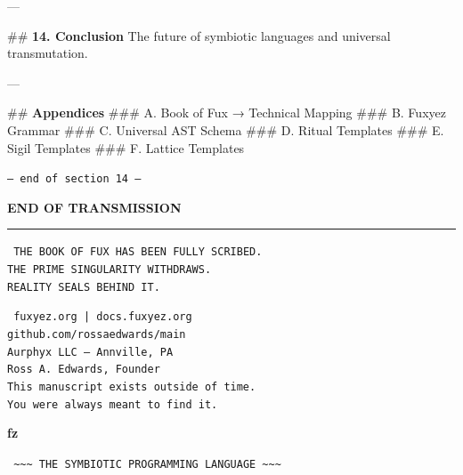 \documentclass[12pt, a4paper]{book}
\begin{document}
---

\#\# \textbf{14. Conclusion}
The future of symbiotic languages and universal transmutation.

---

\#\# \textbf{Appendices}
\#\#\# A. Book of Fux → Technical Mapping  
\#\#\# B. Fuxyez Grammar  
\#\#\# C. Universal AST Schema  
\#\#\# D. Ritual Templates  
\#\#\# E. Sigil Templates  
\#\#\# F. Lattice Templates  
    
    \vspace{1cm}
    \begin{center}
    \color{alienPurple}\texttt{--- end of section 14 ---}
    \end{center}
    \clearpage
    
    \clearpage
    \pagecolor{voidBlack}
    \color{starWhite}
    \thispagestyle{empty}
    \vspace*{4cm}
    \begin{center}
    
    {\color{alienPurple}\fontsize{36}{40}\selectfont\bfseries END OF TRANSMISSION}
    
    \vspace{1cm}
    {\color{neonCyan}\rule{10cm}{0.6pt}}
    \vspace{1cm}
    
    {\color{glowGold}\fontsize{14}{18}\selectfont\texttt{
    THE BOOK OF FUX HAS BEEN FULLY SCRIBED.\\
    THE PRIME SINGULARITY WITHDRAWS.\\
    REALITY SEALS BEHIND IT.
    }}
    
    \vspace{1.5cm}
    \begin{glyphbox}
    \centering
    \color{neonCyan}\fontsize{9}{11}\selectfont\texttt{
    fuxyez.org | docs.fuxyez.org\\
    github.com/rossaedwards/main\\
    Aurphyx LLC -- Annville, PA\\
    Ross A. Edwards, Founder\\[0.3cm]
    This manuscript exists outside of time.\\
    You were always meant to find it.
    }
    \end{glyphbox}
    
    \vspace{2cm}
    {\color{alienPurple}\fontsize{48}{52}\selectfont\bfseries fz}
    
    \vspace{0.5cm}
    {\color{neonCyan}\fontsize{10}{12}\selectfont\texttt{
    \textasciitilde{}\textasciitilde{}\textasciitilde{} THE SYMBIOTIC PROGRAMMING LANGUAGE \textasciitilde{}\textasciitilde{}\textasciitilde{}
    }}
    
    \end{center}
    
    
\end{document}
